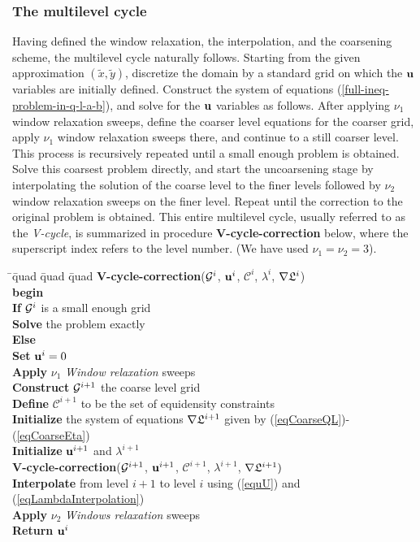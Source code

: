 \documentclass[final]{siamltex}
\newcommand{\keyw}[1]{{\bf #1}}
\begin{document}
\subsubsection{The multilevel cycle}\label{sMultilevel-cycle}
\par Having defined the window relaxation, the interpolation, and
the coarsening scheme, the multilevel cycle naturally follows.
Starting from the given approximation $(\tilde{x},\tilde{y})$,
discretize the domain by a standard grid on which the ${\bf u}$
variables are initially defined. Construct the system of equations
(\ref{full-ineq-problem-in-q-l-a-b}), and solve for the ${\bf u}$
variables as follows. After applying $\nu_1$ window relaxation
sweeps, define the coarser level equations for the coarser grid,
apply $\nu_1$ window relaxation sweeps there, and continue to a
still coarser level. This process is recursively repeated until a small
enough problem is obtained. Solve this coarsest problem directly,
and start the uncoarsening stage by interpolating the solution of
the coarse level to the finer levels followed by $\nu_2$ window
relaxation sweeps on the finer level. Repeat until the correction
to the original problem is obtained. This entire multilevel cycle,
usually referred to as the {\it V-cycle}, is summarized in
procedure {\bf V-cycle-correction} below, where the superscript
index refers to the level number. (We have used $\nu_1=\nu_2=3$).
\vspace{6mm}
\begin{tabbing}
  \quad \=\quad \=quad \=quad \=quad         \kill
  {\bf V-cycle-correction}($\mathcal{G}^i$, ${\bf u}^i$, $\mathcal{C}^i$, $\lambda^i$, $\nabla\mathfrak{L}^i$)\\
  \keyw{begin}\\
  \> \keyw{If} $\mathcal{G}^i$ is a small enough grid\\
  \>\> \keyw{Solve} the problem exactly\\
  \> \keyw{Else}\\
  \>\> \keyw{Set} ${\bf u}^i=0$\\
  \>\> \keyw{Apply} $\nu_1$ {\it Window relaxation} sweeps\\
  \>\> \keyw{Construct} $\mathcal{G}^{i+1}$ the coarse level grid\\
  \>\> \keyw{Define} $\mathcal{C}^{i+1}$ to be the set of equidensity constraints\\
  \>\> \keyw{Initialize} the system of equations $\nabla\mathfrak{L}^{i+1}$ given by (\ref{eqCoarseQL})-(\ref{eqCoarseEta})\\
  \>\> \keyw{Initialize} ${\bf u}^{i+1}$ and $\lambda^{i+1}$\\
  \>\> \keyw{V-cycle-correction}($\mathcal{G}^{i+1}$, ${\bf u}^{i+1}$, $\mathcal{C}^{i+1}$, $\lambda^{i+1}$, $\nabla\mathfrak{L}^{i+1})$\\
\>\> \keyw{Interpolate} from level $i+1$ to level $i$ using (\ref{equU}) and (\ref{eqLambdaInterpolation})\\
    \>\> \keyw{Apply} $\nu_2$ {\it Windows relaxation} sweeps\\
   \keyw{Return} ${\bf u}^i$\\
\end{tabbing}
\end{document}
